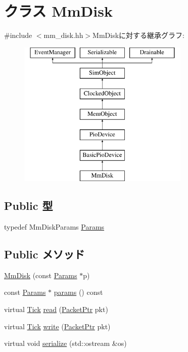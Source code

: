 \hypertarget{classMmDisk}{
\section{クラス MmDisk}
\label{classMmDisk}
}


{\ttfamily \#include $<$mm\_\-disk.hh$>$}MmDiskに対する継承グラフ:\begin{figure}[H]
\begin{center}
\leavevmode
\includegraphics[height=7cm]{classMmDisk}
\end{center}
\end{figure}
\subsection*{Public 型}
\begin{DoxyCompactItemize}
\item 
typedef MmDiskParams \hyperlink{classMmDisk_a9e8be66baf207ea5dcd34d3f71d3734b}{Params}
\end{DoxyCompactItemize}
\subsection*{Public メソッド}
\begin{DoxyCompactItemize}
\item 
\hyperlink{classMmDisk_aee281487cb9cc386c7da1b3df89eee9b}{MmDisk} (const \hyperlink{classMmDisk_a9e8be66baf207ea5dcd34d3f71d3734b}{Params} $\ast$p)
\item 
const \hyperlink{classMmDisk_a9e8be66baf207ea5dcd34d3f71d3734b}{Params} $\ast$ \hyperlink{classMmDisk_acd3c3feb78ae7a8f88fe0f110a718dff}{params} () const 
\item 
virtual \hyperlink{base_2types_8hh_a5c8ed81b7d238c9083e1037ba6d61643}{Tick} \hyperlink{classMmDisk_a613ec7d5e1ec64f8d21fec78ae8e568e}{read} (\hyperlink{classPacket}{PacketPtr} pkt)
\item 
virtual \hyperlink{base_2types_8hh_a5c8ed81b7d238c9083e1037ba6d61643}{Tick} \hyperlink{classMmDisk_a4cefab464e72b5dd42c003a0a4341802}{write} (\hyperlink{classPacket}{PacketPtr} pkt)
\item 
virtual void \hyperlink{classMmDisk_a53e036786d17361be4c7320d39c99b84}{serialize} (std::ostream \&os)
\end{DoxyCompactItemize}
